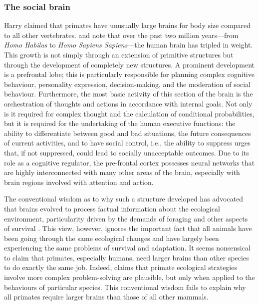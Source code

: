 \subsubsection{The social brain}

Harry \citet{Jerison1973} claimed that primates have unusually large brains for body size compared to all other vertebrates. \citet{Gilbert2004} and \citet{Schoenemann2006} note that over the past two million years---from \emph{Homo Habilus} to \emph{Homo Sapiens Sapiens}---the human brain has tripled in weight. This growth is not simply through an extension of primitive structures but through the development of completely new structures. A prominent development is a prefrontal lobe; this is particularly responsible for planning complex cognitive behaviour, personality expression, decision-making, and the moderation of social behaviour. Furthermore, the most basic activity of this section of the brain is the orchestration of thoughts and actions in accordance with internal goals. Not only is it required for complex thought and the calculation of conditional probabilities, but it is required for the undertaking of the human executive functions: the ability to differentiate between good and bad situations, the future consequences of current activities, and to have social control, i.e., the ability to suppress urges that, if not suppressed, could lead to socially unacceptable outcomes. Due to its role as a cognitive regulator, the pre-frontal cortex possesses neural networks that are highly interconnected with many other areas of the brain, especially with brain regions involved with attention and action.

The conventional wisdom as to why such a structure developed has advocated that brains evolved to process factual information about the ecological environment, particularity driven by the demands of foraging and other aspects of survival \citep{BrockHarvey1980}. This view, however, ignores the important fact that all animals have been going through the same ecological changes and have largely been experiencing the same problems of survival and adaptation. It seems nonsensical to claim that primates, especially humans, need larger brains than other species to do exactly the same job. Indeed, claims that primate ecological strategies involve more complex problem-solving are plausible, but only when applied to the behaviours of particular species. This conventional wisdom fails to explain why all primates require larger brains than those of all other mammals.

